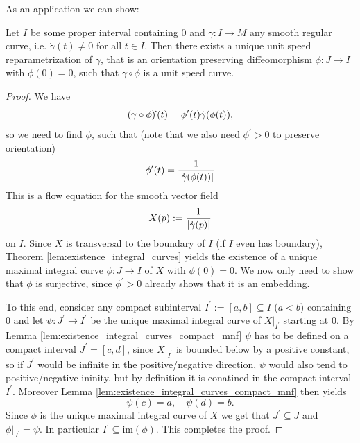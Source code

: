 As an application we can show:

\begin{lemma}
    Let $I$ be some proper interval containing $0$ and $\gamma \colon I \to M$ any smooth regular curve, i.e. $\dot{\gamma}(t) \neq 0$ for all $t \in I$. Then there exists a unique unit speed reparametrization of $\gamma$, that is an orientation preserving diffeomorphism $\phi \colon J \to I$ with $\phi(0) = 0$, such that $\gamma \circ \phi$ is a unit speed curve. 
\end{lemma}

\begin{proof}
    We have 
    \[
    (\gamma \circ \phi)^{\raisebox{2pt}{\scalebox{0.4}{$\bullet$}}}(t) = \phi^\prime(t) \dot{\gamma}(\phi(t)),
    \]
    so we need to find $\phi$, such that (note that we also need $\phi^\prime > 0$ to preserve orientation)
    \[
    \phi^\prime(t) = \frac{1}{\lvert\dot{\gamma}(\phi(t))\rvert}
    \]
    This is a flow equation for the smooth vector field
    \[
    X(p) := \frac{1}{\lvert\dot{\gamma}(p)\rvert}
    \]
    on $I$. Since $X$ is transversal to the boundary of $I$ (if $I$ even has boundary), Theorem \ref{lem:existence_integral_curves} yields the existence of a unique maximal integral curve $\phi \colon J \to I$ of $X$ with $\phi(0) = 0$. We now only need to show that $\phi$ is surjective, since $\phi^\prime >0$ already shows that it is an embedding. 
    
    To this end, consider any compact subinterval $I^\prime := [a,b] \subseteq I$ ($a < b$) containing $0$ and let $\psi \colon J^\prime \to I^\prime$ be the unique maximal integral curve of $X|_{I^\prime}$ starting at $0$. By Lemma \ref{lem:existence_integral_curves_compact_mnf} $\psi$ has to be defined on a compact interval $J^\prime = [c,d]$, since $X|_{I^\prime}$ is bounded below by a positive constant, so if $J^\prime$ would be infinite in the positive/negative direction, $\psi$ would also tend to positive/negative ininity, but by definition it is conatined in the compact interval $I^\prime$. Moreover Lemma \ref{lem:existence_integral_curves_compact_mnf} then yields
    \[
    \psi(c) = a, \quad \psi(d) = b.
    \]
    Since $\phi$ is the unique maximal integral curve of $X$ we get that $J^\prime \subseteq J$ and $\phi|_{J^\prime} = \psi$. In particular $I^\prime \subseteq \mathrm{im}(\phi)$. This completes the proof.
\end{proof}

